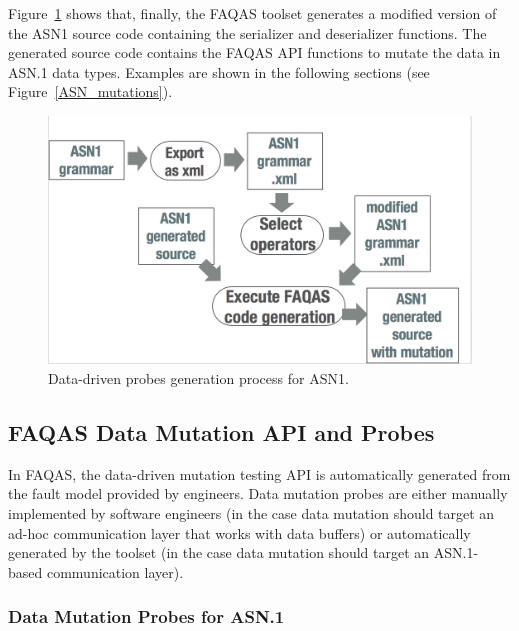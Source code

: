 

Figure~\ref{fig:ASN1ProbesGeneration} shows that, finally, the FAQAS toolset generates a modified version of the ASN1 source code containing the serializer and deserializer functions. The generated source code contains the FAQAS API functions to mutate the data in ASN.1 data types. Examples are shown in the following sections (see Figure~\ref{ASN_mutations}).

\begin{figure}[h]
  \centering
    \includegraphics[width=12cm]{images/ASN1mutationProces}
      \caption{Data-driven probes generation process for ASN1.}
      \label{fig:ASN1ProbesGeneration}
\end{figure}








\clearpage
\subsection{FAQAS Data Mutation API and Probes}
\label{sec:FAQASDataMutationProbes}

In FAQAS, the data-driven mutation testing API is automatically generated from the fault model provided by engineers. Data mutation probes are either manually implemented by software engineers (in the case data mutation should target an ad-hoc communication layer that works with data buffers) or automatically generated by the toolset (in the case data mutation should target an ASN.1-based communication layer).



\subsubsection{Data Mutation Probes for ASN.1}
\label{sec:FAQASDataMutationProbesASN}

